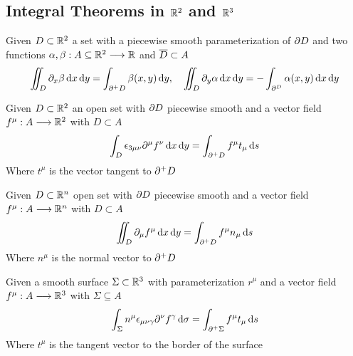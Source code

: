 \documentclass[../complete.tex]{subfiles}
\begin{document}
\subsection{Integral Theorems in $\mathbb{R}^2$ and $\mathbb{R}^3$}
\begin{thm}
	Given $D\subset\mathbb{R}^2$ a set with a piecewise smooth parameterization of $\partial D$ and two functions $\alpha,\beta:A\subseteq\mathbb{R}^2\overset{}{\longrightarrow}\mathbb{R}$ and $\overline{D}\subset A$
	\begin{equation}
		\iint_{D}^{}\partial_x\beta\operatorname{d\!} x\operatorname{d\!} y=\int_{\partial^+D}^{}\beta(x,y)\operatorname{d\!} y,\quad\iint_D\partial_y\alpha\operatorname{d\!} x\operatorname{d\!} y=-\int_{\partial^D}\alpha(x,y)\operatorname{d\!} x\operatorname{d\!} y
		\label{eq:gaussgreen1}
	\end{equation}
\end{thm}
\begin{thm}[Stokes]
	Given $D\subset\mathbb{R}^2$ an open set with $\partial D$ piecewise smooth and a vector field $f^\mu:A\overset{}{\longrightarrow}\mathbb{R}^2$ with $D\subset A$
	\begin{equation}
		\int_{D}^{}\epsilon_{3\mu\nu}\partial^\mu f^\nu\operatorname{d\!} x\operatorname{d\!} y=\int_{\partial^+D}f^\mu t_\mu\operatorname{d\!} s
		\label{eq:stokes}
	\end{equation}
	Where $t^\mu$ is the vector tangent to $\partial^+D$
\end{thm}
\begin{thm}[Gauss 1]
	Given $D\subset\mathbb{R}^n$ open set with $\partial D$ piecewise smooth and a vector field $f^\mu:A\overset{}{\longrightarrow}\mathbb{R}^n$ with $D\subset A$
	\begin{equation}
		\iint_D\partial_\mu f^\mu\operatorname{d\!} x\operatorname{d\!} y=\int_{\partial^+D}f^\mu n_\mu\operatorname{d\!} s
		\label{eq:gaussthm}
	\end{equation}
	Where $n^\mu$ is the normal vector to $\partial^+D$
\end{thm}
\begin{thm}
	Given a smooth surface $\Sigma\subset\mathbb{R}^3$ with parameterization $r^\mu$ and a vector field $f^\mu:A\overset{}{\longrightarrow}\mathbb{R}^3$ with $\Sigma\subseteq A$
	\begin{equation}
		\int_\Sigma n^\mu\epsilon_{\mu\nu\gamma}\partial^\nu f^\gamma\operatorname{d\!}\sigma=\int_{\partial^+\Sigma}f^\mu t_\mu\operatorname{d\!} s
		\label{eq:stokessurf}
	\end{equation}
	Where $t^\mu$ is the tangent vector to the border of the surface
\end{thm}
\end{document}
